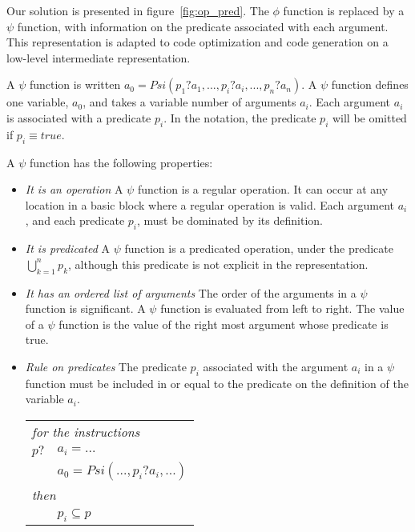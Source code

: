 Our solution is presented in figure~\ref{fig:op_pred}. The $\phi$
function is replaced by a $\psi$ function, with information on the
predicate associated with each argument. This representation is
adapted to code optimization and code generation on a low-level
intermediate representation.

A $\psi$ function is written ${a}_0 = Psi(p_1?{a}_1, ..., {p}_i?{a}_i,
  ..., {p}_n?{a}_n)$. A $\psi$ function defines one variable, ${ {a}_0}$, and takes a variable number of arguments ${a}_i$. Each
argument ${a}_i$ is associated with a predicate ${p}_i$. In
the notation, the predicate ${p}_i$ will be omitted if ${p}_i
  \equiv {true}$.

A $\psi$ function has the following properties:

\begin{itemize}

\item{\emph{It is an operation}} A $\psi$ function is a regular operation. It
  can occur at any location in a basic block where a regular operation
  is valid. Each argument ${a}_i$, and each predicate ${p}_i$,
  must be dominated by its definition.

\item{\emph{It is predicated}} A $\psi$ function is a predicated
  operation, under the predicate ${\bigcup_{k=1}^n p_k}$,
  although this predicate is not explicit in the representation.

\item{\emph{It has an ordered list of arguments}} The order of the
  arguments in a $\psi$ function is significant. A $\psi$ function is
  evaluated from left to right. The value of a $\psi$ function is the
  value of the right most argument whose predicate is true.

\item{\emph{Rule on predicates}} The predicate ${p}_i$ associated
  with the argument ${a}_i$ in a $\psi$ function must be included
  in or equal to the predicate on the definition of the variable ${
    a_i}$.

\begin{tabular}{ll}
\multicolumn{2}{l}{\it for the instructions}\\
${p?}$ & ${a}_i = ...$\\
& ${a}_0 = {Psi}(..., {p}_i?{a}_i, ...)$\\
\multicolumn{2}{l}{\it then}\\
& ${p}_i \subseteq {p}$\\
\end{tabular}

\end{itemize}

